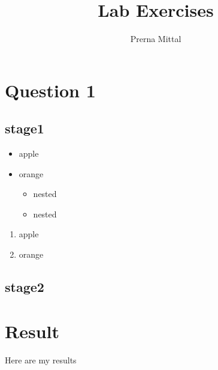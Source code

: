 \documentclass[a4paper,12pt]{article}
\begin{document}
    \title{Lab Exercises}
    \author{Prerna Mittal}
    \maketitle
    \tableofcontents
    \newpage

    \label{page2}
    \section{Question 1}
    \subsection{stage1}
    \begin{itemize}
        \item apple
        \item orange
        \begin{itemize}
            \item nested
            \item nested
        \end{itemize}
    \end{itemize}
    \begin{enumerate}
        \item apple
        \item orange
    \end{enumerate}
    \subsection{stage2}
    \section{Result}
    Here are my results
    
\end{document}

